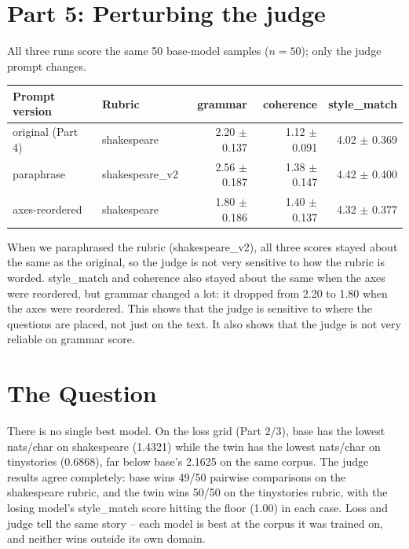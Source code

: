 \documentclass{article}
\begin{document}
\clearpage

\section{Part 5: Perturbing the judge}

All three runs score the same 50 base-model samples ($n=50$); only the judge prompt changes.

\begin{center}
\begin{tabular}{llrrr}
\toprule
Prompt version & Rubric & grammar & coherence & style\_match \\
\midrule
original (Part 4)  & shakespeare & 2.20 $\pm$ 0.137 & 1.12 $\pm$ 0.091 & 4.02 $\pm$ 0.369 \\
paraphrase          & shakespeare\_v2 & 2.56 $\pm$ 0.187 & 1.38 $\pm$ 0.147 & 4.42 $\pm$ 0.400 \\
axes-reordered       & shakespeare & 1.80 $\pm$ 0.186 & 1.40 $\pm$ 0.137 & 4.32 $\pm$ 0.377 \\
\bottomrule
\end{tabular}
\end{center}

When we paraphrased the rubric (shakespeare\_v2), all three scores
stayed about the same as the original, so the judge is not very
sensitive to how the rubric is worded. style\_match and coherence also
stayed about the same when the axes were reordered, but grammar
changed a lot: it dropped from 2.20 to 1.80 when the axes were reordered.
This shows that the judge is sensitive to where the questions are placed, not just on the text.
It also shows that the judge is not very reliable on grammar score.

\section{The Question}

There is no single best model. On the loss grid (Part 2/3), base has the lowest nats/char on shakespeare (1.4321)
while the twin has the lowest nats/char on tinystories (0.6868), far below base's 2.1625 on the same corpus.
The judge results agree completely: base wins 49/50 pairwise comparisons on the shakespeare rubric, and the
twin wins 50/50 on the tinystories rubric, with the losing model's style\_match score hitting the floor (1.00)
in each case. Loss and judge tell the same story -- each model is best at the corpus it was trained on, and
neither wins outside its own domain.
\end{document}
